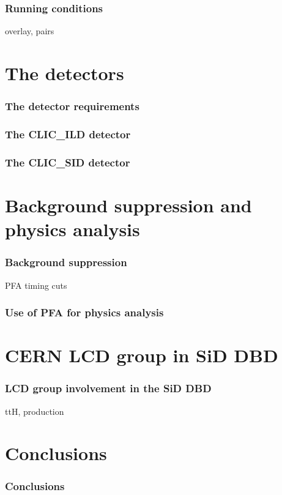 \documentclass{beamer}
\begin{document}
\begin{frame}
\frametitle{Running conditions}
overlay, pairs
\end{frame}

\section{The detectors}
\begin{frame}
\frametitle{The detector requirements}

\end{frame}
\begin{frame}
\frametitle{The CLIC\_ILD detector}
\end{frame}
\begin{frame}
\frametitle{The CLIC\_SID detector}
\end{frame}

\section[Bkg suppression \& phys. analysis]{Background suppression and physics
analysis}
\begin{frame}
\frametitle{Background suppression}
PFA timing cuts
\end{frame}

\begin{frame}
\frametitle{Use of PFA for physics analysis}
\end{frame}

\section[LCD for the DBD]{CERN LCD group in SiD DBD}
\begin{frame}
\frametitle{LCD group involvement in the SiD DBD}
ttH, production
\end{frame}

\section{Conclusions}
\begin{frame}
\frametitle{Conclusions}

\end{frame}
\end{document}
